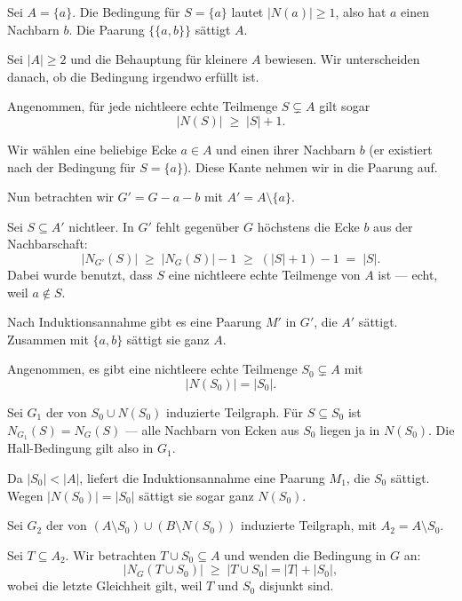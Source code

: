 \begin{merksatz}
Sei $A = \{a\}$. Die Bedingung für $S = \{a\}$ lautet $|N(a)| \ge 1$, also hat $a$ einen Nachbarn $b$. Die Paarung $\{\{a,b\}\}$ sättigt $A$.

Sei $|A| \ge 2$ und die Behauptung für kleinere $A$ bewiesen. Wir unterscheiden danach, ob die Bedingung irgendwo  erfüllt ist.

Angenommen, für jede nichtleere echte Teilmenge $S \subsetneq A$ gilt sogar
\[ |N(S)| \;\ge\; |S| + 1 . \]

Wir wählen eine beliebige Ecke $a \in A$ und einen ihrer Nachbarn $b$ (er existiert nach der Bedingung für $S = \{a\}$). Diese Kante nehmen wir in die Paarung auf.

Nun betrachten wir $G' = G - a - b$ mit $A' = A \setminus \{a\}$.

 Sei $S \subseteq A'$ nichtleer. In $G'$ fehlt gegenüber $G$ höchstens die Ecke $b$ aus der Nachbarschaft:
\[ |N_{G'}(S)| \;\ge\; |N_G(S)| - 1 \;\ge\; (|S| + 1) - 1 \;=\; |S| . \]
Dabei wurde benutzt, dass $S$ eine nichtleere echte Teilmenge von $A$ ist --- echt, weil $a \notin S$.

Nach Induktionsannahme gibt es eine Paarung $M'$ in $G'$, die $A'$ sättigt. Zusammen mit $\{a,b\}$ sättigt sie ganz $A$.

Angenommen, es gibt eine nichtleere echte Teilmenge $S_0 \subsetneq A$ mit
\[ |N(S_0)| = |S_0| . \]

 Sei $G_1$ der von $S_0 \cup N(S_0)$ induzierte Teilgraph. Für $S \subseteq S_0$ ist $N_{G_1}(S) = N_G(S)$ --- alle Nachbarn von Ecken aus $S_0$ liegen ja in $N(S_0)$. Die Hall-Bedingung gilt also in $G_1$.

Da $|S_0| < |A|$, liefert die Induktionsannahme eine Paarung $M_1$, die $S_0$ sättigt. Wegen $|N(S_0)| = |S_0|$ sättigt sie sogar ganz $N(S_0)$.

 Sei $G_2$ der von $(A \setminus S_0) \cup (B \setminus N(S_0))$ induzierte Teilgraph, mit $A_2 = A \setminus S_0$.

 Sei $T \subseteq A_2$. Wir betrachten $T \cup S_0 \subseteq A$ und wenden die Bedingung in $G$ an:
\[ |N_G(T \cup S_0)| \;\ge\; |T \cup S_0| = |T| + |S_0| , \]
wobei die letzte Gleichheit gilt, weil $T$ und $S_0$ disjunkt sind.


\end{merksatz}
